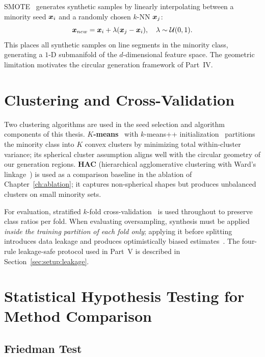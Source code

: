 SMOTE~\cite{chawla2002smote} generates synthetic samples by linearly interpolating between a minority seed $\bm{x}_i$ and a randomly chosen $k$-NN $\bm{x}_j$:
\begin{equation}
  \bm{x}_{new} = \bm{x}_i + \lambda(\bm{x}_j - \bm{x}_i), \quad \lambda \sim \mathcal{U}(0,1).
  \label{eq:smote_bg}
\end{equation}
This places all synthetic samples on line segments in the minority class, generating a $1$-D submanifold of the $d$-dimensional feature space.
The geometric limitation motivates the circular generation framework of Part~IV.

\section{Clustering and Cross-Validation}
\label{sec:bg:clustering}

Two clustering algorithms are used in the seed selection and algorithm components of this thesis.
\textbf{$K$-means}~\cite{macqueen1967some} with $k$-means++ initialization~\cite{arthur2007kmeans} partitions the minority class into $K$ convex clusters by minimizing total within-cluster variance; its spherical cluster assumption aligns well with the circular geometry of our generation regions.
\textbf{HAC} (hierarchical agglomerative clustering with Ward's linkage~\cite{murtagh2012algorithms}) is used as a comparison baseline in the ablation of Chapter~\ref{ch:ablation}; it captures non-spherical shapes but produces unbalanced clusters on small minority sets.

For evaluation, stratified $k$-fold cross-validation~\cite{kohavi1995study} is used throughout to preserve class ratios per fold.
When evaluating oversampling, synthesis must be applied \emph{inside the training partition of each fold only}; applying it before splitting introduces data leakage and produces optimistically biased estimates~\cite{kaufman2012leakage, cawley2010over}.
The four-rule leakage-safe protocol used in Part~V is described in Section~\ref{sec:setup:leakage}.

\section{Statistical Hypothesis Testing for Method Comparison}
\label{sec:bg:statistics}

\subsection{Friedman Test}

